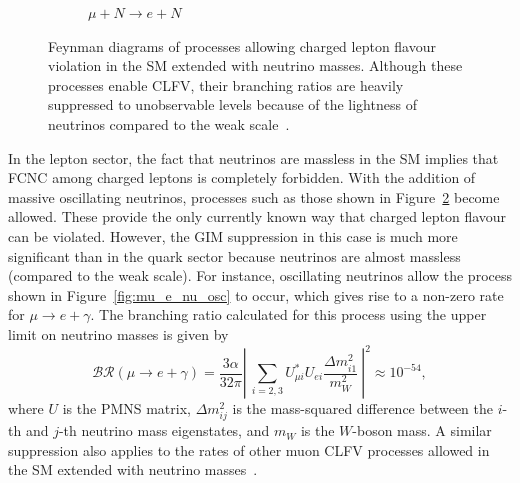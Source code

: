 \begin{figure}
\begin{subfigure}[t]{0.45\textwidth}
    \caption{
        $\mu+N \rightarrow e + N$
    }
    \label{fig:mu-e_conv_SM}
\end{subfigure}
    \caption{
        Feynman diagrams of processes allowing charged lepton flavour
        violation in the SM extended with neutrino masses. Although these
        processes enable CLFV, their branching ratios are heavily suppressed to
        unobservable levels because of the lightness of
        neutrinos compared to the weak scale~\cite{BERNSTEIN201327}.}
    \label{fig:lepton_fcnc}
\end{figure}

In the lepton sector, the fact that neutrinos are massless in the SM implies
that FCNC among charged leptons is completely forbidden. With the addition of
massive oscillating neutrinos, processes such as those shown in
Figure~\ref{fig:lepton_fcnc} become allowed. These provide the only currently
known way that charged lepton flavour can be violated. However, the GIM
suppression in this case is much more significant than in the quark sector
because neutrinos are almost massless (compared to the weak scale). For
instance, oscillating neutrinos allow the process shown in
Figure~\ref{fig:mu_e_nu_osc} to occur, which gives rise to a non-zero rate for
${\mu \rightarrow e + \gamma}$. The branching ratio calculated for this process
using the upper limit on neutrino masses is given by~\cite{BERNSTEIN201327}
\begin{equation}\label{eq:br_meg}
\mathcal{BR}(\mu \rightarrow e + \gamma) = \frac{3\alpha}{32\pi} \left|\ \sum_{i=2, 3} U^*_{\mu i} U_{e i} 
\frac{\Delta m^2_{i1}}{m^2_W}  \ \right| ^2 \approx 10^{-54},
\end{equation}
where $U$ is the PMNS matrix, $\Delta m^2_{ij}$ is the mass-squared difference
between the $i$-th and $j$-th neutrino mass eigenstates, and $m_W$ is the
$W$-boson mass. 
A similar suppression also applies to the rates of other muon CLFV processes allowed in the
SM extended with neutrino masses~\cite{doi:10.1063/1.56214}.

